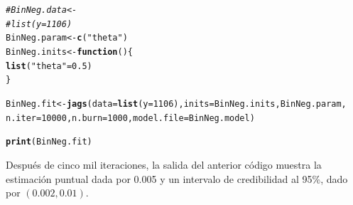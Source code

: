 \documentclass[10pt,openright]{book}\usepackage[]{graphicx}\usepackage[]{color}
\makeatletter
\newcommand{\hlnum}[1]{\textcolor[rgb]{0.686,0.059,0.569}{#1}}%
\newcommand{\hlstr}[1]{\textcolor[rgb]{0.192,0.494,0.8}{#1}}%
\newcommand{\hlcom}[1]{\textcolor[rgb]{0.678,0.584,0.686}{\textit{#1}}}%
\newcommand{\hlstd}[1]{\textcolor[rgb]{0.345,0.345,0.345}{#1}}%
\newcommand{\hlkwa}[1]{\textcolor[rgb]{0.161,0.373,0.58}{\textbf{#1}}}%
\newcommand{\hlkwb}[1]{\textcolor[rgb]{0.69,0.353,0.396}{#1}}%
\newcommand{\hlkwc}[1]{\textcolor[rgb]{0.333,0.667,0.333}{#1}}%
\newcommand{\hlkwd}[1]{\textcolor[rgb]{0.737,0.353,0.396}{\textbf{#1}}}%
\newenvironment{kframe}{%
 \def\at@end@of@kframe{}%
 \ifinner\ifhmode%
  \def\at@end@of@kframe{\end{minipage}}%
  \begin{minipage}{\columnwidth}%
 \fi\fi%
 \def\FrameCommand##1{\hskip\@totalleftmargin \hskip-\fboxsep
 \colorbox{shadecolor}{##1}\hskip-\fboxsep
     \hskip-\linewidth \hskip-\@totalleftmargin \hskip\columnwidth}%
 \MakeFramed {\advance\hsize-\width
   \@totalleftmargin\z@ \linewidth\hsize
   \@setminipage}}%
 {\par\unskip\endMakeFramed%
 \at@end@of@kframe}
\newenvironment{knitrout}{}{} %
\makeatother
\begin{document}
\begin{Eje}
\begin{knitrout}
\begin{kframe}
\begin{alltt}
\hlcom{#BinNeg.data <- }
\hlcom{#list(y =1106)}
\hlstd{BinNeg.param} \hlkwb{<-} \hlkwd{c}\hlstd{(}\hlstr{"theta"}\hlstd{)}
\hlstd{BinNeg.inits} \hlkwb{<-} \hlkwa{function}\hlstd{()\{}
\hlkwd{list}\hlstd{(}\hlstr{"theta"}\hlstd{=}\hlnum{0.5}\hlstd{)}
\hlstd{\}}

\hlstd{BinNeg.fit} \hlkwb{<-} \hlkwd{jags}\hlstd{(}\hlkwc{data}\hlstd{=}\hlkwd{list}\hlstd{(}\hlkwc{y}\hlstd{=}\hlnum{1106}\hlstd{),} \hlkwc{inits}\hlstd{=BinNeg.inits, BinNeg.param,}
                   \hlkwc{n.iter}\hlstd{=}\hlnum{10000}\hlstd{,} \hlkwc{n.burn}\hlstd{=}\hlnum{1000}\hlstd{,} \hlkwc{model.file}\hlstd{=BinNeg.model)}

\hlkwd{print}\hlstd{(BinNeg.fit)}
\end{alltt}
\end{kframe}
\end{knitrout}
    
    Despu\'es de cinco mil iteraciones, la salida del anterior c\'odigo muestra la estimaci\'on puntual dada por 0.005 y un intervalo de credibilidad al 95\%, dado por $(0.002, 0.01)$.
    \end{Eje}
    
\end{document}
